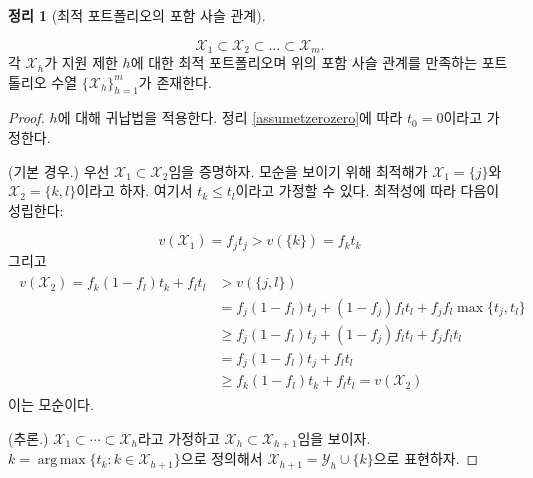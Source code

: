 \documentclass[11pt]{article} %
\DeclareMathOperator*{\argmax}{arg\,max}
\newif\ifen
\newtheorem{theorem}{Theorem}
\theoremstyle{definition}
\newtheorem{theorem}{정리}
\theoremstyle{definition}
\begin{document}
\begin{theorem}[\ifen Nestedness of optimal application portfolios\else 최적 포트폴리오의 포함 사슬 관계\fi] \label{nestedapplication}
\ifen There exists a sequence of portfolios $\{\mathcal{X}_h\}_{h=1}^m$ satisfying the nestedness relation \fi
\begin{equation}
\mathcal{X}_1 \subset \mathcal{X}_2\subset \dots \subset \mathcal{X}_m.
\end{equation}
\ifen such that each $\mathcal{X}_h$ is an optimal application portfolio when the application limit is $h$.
\else  각 $\mathcal{X}_h$가 지원 제한 $h$에 대한 최적 포트폴리오며 위의 포함 사슬 관계를 만족하는 포트톨리오 수열  $\{\mathcal{X}_h\}_{h=1}^m$가 존재한다.\fi
\end{theorem}

\begin{proof}\ifen
By induction on $h$. Applying Theorem \ref{assumetzerozero}, we assume that $t_0 = 0$. 

(Base case.) First, we will show that $\mathcal{X}_1 \subset \mathcal{X}_2$. To get a contradiction, suppose that the optima are $\mathcal{X}_1 = \{j\}$ and $\mathcal{X}_2 = \{k, l\}$, where we may assume that $t_k \leq t_l$. Optimality requires that
\else$h$에 대해 귀납법을 적용한다. 정리 \ref{assumetzerozero}에 따라 $t_0 = 0$이라고 가정한다.

(기본 경우.) 우선 $\mathcal{X}_1 \subset \mathcal{X}_2$임을 증명하자. 모순을 보이기 위해 최적해가 $\mathcal{X}_1 = \{j\}$와 $\mathcal{X}_2 = \{k, l\}$이라고 하자. 여기서 $t_k \leq t_l$이라고 가정할 수 있다. 최적성에 따라 다음이 성립한다:
\fi
\begin{equation}v(\mathcal{X}_1 )  = f_j t_j > v(\{k\}) = f_k t_k\end{equation}
\ifen and \else 그리고\fi
\begin{align}
\begin{split}
v(\mathcal{X}_2) =  f_k (1- f_l) t_k + f_l t_l &> v(\{j, l\}) \\
& = f_j (1- f_l) t_j + (1- f_j) f_l t_l + f_j f_l \max\{t_j, t_l\} \\
&\geq  f_j (1- f_l) t_j + (1- f_j) f_l t_l + f_j f_l  t_l \\
&= f_j (1- f_l) t_j + f_l t_l  \\
&\geq f_k (1- f_l) t_k + f_l t_l  = v(\mathcal{X}_2)
\end{split}
\end{align}
\ifen which is a contradiction. 
\else 이는 모순이다.\fi

\ifen (Inductive step.) Assume that $\mathcal{X}_1 \subset \cdots \subset \mathcal{X}_h$, and we will show $\mathcal{X}_h \subset \mathcal{X}_{h+1}$. Let $k = \argmax\{ t_k: k \in \mathcal{X}_{h+1}\}$ and write $\mathcal{X}_{h+1} = \mathcal{Y}_{h} \cup \{k\}$.
\else (추론.) $\mathcal{X}_1 \subset \cdots \subset \mathcal{X}_h$라고 가정하고 $\mathcal{X}_h \subset \mathcal{X}_{h+1}$임을 보이자. $k = \argmax\{ t_k: k \in \mathcal{X}_{h+1}\}$으로 정의해서 $\mathcal{X}_{h+1} = \mathcal{Y}_{h} \cup \{k\}$으로 표현하자.\fi


\end{proof}
\end{document}

